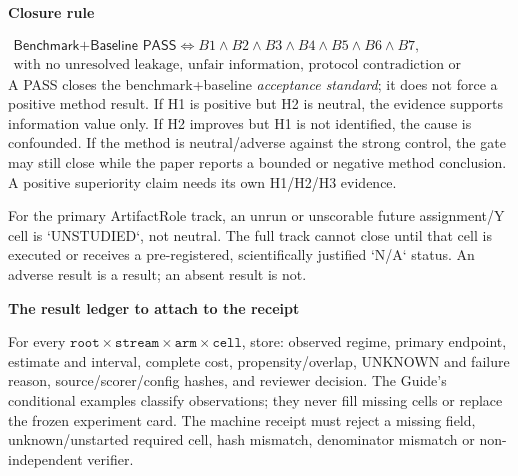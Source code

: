 \documentclass[10pt,a4paper]{article}
\newcommand{\lead}[1]{\vspace{4pt}\textbf{#1}\par}
\begin{document}
\lead{Closure rule}
\[
\begin{gathered}
\textsf{Benchmark+Baseline PASS}
\iff B1\land B2\land B3\land B4\land B5\land B6\land B7,\\
\text{with no unresolved leakage, unfair information, protocol contradiction or missing denominator.}
\end{gathered}
\]
A PASS closes the benchmark+baseline \emph{acceptance standard}; it does not
force a positive method result. If H1 is positive but H2 is neutral, the evidence
supports information value only. If H2 improves but H1 is not identified, the
cause is confounded. If the method is neutral/adverse against the strong control,
the gate may still close while the paper reports a bounded or negative method
conclusion. A positive superiority claim needs its own H1/H2/H3 evidence.

For the primary ArtifactRole track, an unrun or unscorable future assignment/Y
cell is `UNSTUDIED`, not neutral. The full track cannot close until that cell is
executed or receives a pre-registered, scientifically justified `N/A` status.
An adverse result is a result; an absent result is not.

\lead{The result ledger to attach to the receipt}
For every $\texttt{root}\times\texttt{stream}\times\texttt{arm}\times\texttt{cell}$, store: observed regime,
primary endpoint, estimate and interval, complete cost, propensity/overlap,
UNKNOWN and failure reason, source/scorer/config hashes, and reviewer decision.
The Guide's conditional examples classify observations; they never fill missing
cells or replace the frozen experiment card. The machine receipt must reject a
missing field, unknown/unstarted required cell, hash mismatch, denominator mismatch
or non-independent verifier.\normalsize
\end{document}
